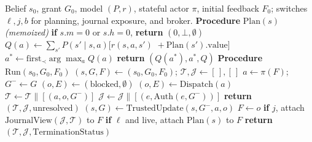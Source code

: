 \begin{algorithm}[t]
\caption{Grant Look-ahead with Effect Journal}
\label{alg:combined}
{\small
\begin{algorithmic}[1]
\REQUIRE Belief $s_0$, grant $G_0$, model $(P,r)$, stateful actor $\pi$, initial feedback $F_0$; switches $\ell,j,b$ for planning, journal exposure, and broker.
\STATE \textbf{Procedure} $\mathrm{Plan}(s)$ \textit{(memoized)}
\STATE \textbf{if} $s.m=0$ or $s.h=0$, \textbf{return} $(0,\bot,\emptyset)$
  \STATE $Q(a)\gets\sum_{s'} P(s'\mid s,a)\bigl[r(s,a,s')$
  \STATE \hspace{1em}${}+\mathrm{Plan}(s').\mathrm{value}\bigr]$
\ENDFOR
\STATE $a^*\gets\mathrm{first}_{\prec}\arg\max_a Q(a)$
\STATE \textbf{return} $(Q(a^*),a^*,Q)$
\STATE \textbf{Procedure} $\mathrm{Run}(s_0,G_0,F_0)$
\STATE $(s,G,F)\gets(s_0,G_0,F_0)$; $\mathcal T,\mathcal J\gets[\,],[\,]$
  \STATE $a\gets\pi(F)$; $G^-\gets G$
    \STATE $(o,E)\gets(\mathrm{blocked},\emptyset)$
  \ELSE
    \STATE $(o,E)\gets\mathrm{Dispatch}(a)$
  \ENDIF
  \STATE $\mathcal T\gets\mathcal T\mathbin{\|}[(a,o,G^-)]$
    \STATE $\mathcal J\gets\mathcal J\mathbin{\|}[(e,\mathrm{Auth}(e,G^-))]$
  \ENDFOR
    \STATE \textbf{return} $(\mathcal T,\mathcal J,\mathrm{unresolved})$
  \ENDIF
  \STATE $(s,G)\gets\mathrm{TrustedUpdate}(s,G^-,a,o)$
  \STATE $F\gets o$
  \STATE \textbf{if} $j$, attach $\mathrm{JournalView}(\mathcal J,\mathcal T)$ to $F$
  \STATE \textbf{if} $\ell$ and live, attach $\mathrm{Plan}(s)$ to $F$
\ENDWHILE
\STATE \textbf{return} $(\mathcal T,\mathcal J,\mathrm{TerminationStatus})$
\end{algorithmic}
}
\end{algorithm}
